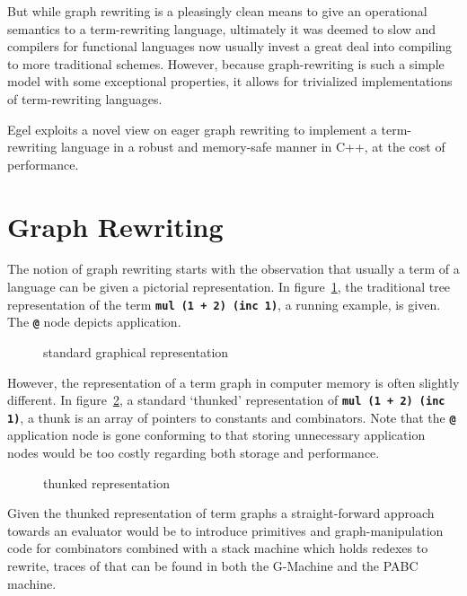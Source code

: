 \documentclass{research4cacm}
\newcommand{\code}[1]{{\bf\texttt{#1}}}
\begin{document}
But while graph rewriting is a pleasingly clean means to give an
operational semantics to a term-rewriting language, ultimately it
was deemed to slow and compilers for functional languages now
usually invest a great deal into compiling to more traditional
schemes.
However, because graph-rewriting is such a simple model with
some exceptional properties, it allows for trivialized implementations
of term-rewriting languages.

Egel exploits a novel view on eager graph rewriting to implement
a term-rewriting language in a robust and memory-safe manner in
C++, at the cost of performance.

\section{Graph Rewriting}

The notion of graph rewriting starts with the observation that usually
a term of a language can be given a pictorial representation.
In figure~\ref{figure:termA}, the traditional tree representation of
the term \code{mul (1 + 2) (inc 1)}, a running example, is given. 
The \code{@} node depicts application.

\begin{figure}[h]
\begin{center}
\caption{standard graphical representation}
\label{figure:termA}
\end{center}
\end{figure}

However, the representation of a term graph in computer memory is often
slightly different. In figure~\ref{figure:termB}, a standard `thunked'
representation of \code{mul (1 + 2) (inc 1)}, a thunk is an array
of pointers to constants and combinators.
Note that the \code{@} application node is gone conforming to
that storing unnecessary application nodes would be too 
costly regarding both storage and performance.

\begin{figure}[h]
\begin{center}
\caption{thunked representation}
\label{figure:termB}
\end{center}
\end{figure}

Given the thunked representation of term graphs a straight-forward
approach towards an evaluator would be to introduce primitives
and graph-manipulation code for combinators combined with a stack machine 
which holds redexes to rewrite, traces of that can be found in 
both the G-Machine and the PABC machine.
\end{document}
